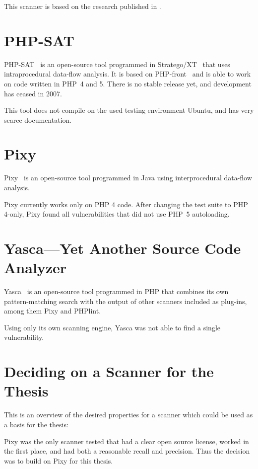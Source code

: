 This scanner is based on the research published in \cite{huang-securing}.

\section{PHP-SAT}
\label{php-sat}
PHP-SAT~\cite{php-sat} is an open-source tool programmed in Stratego/XT~\cite{stratego} that uses intraprocedural data-flow analysis. It is based on PHP-front~\cite{php-front} and is able to work on code written in PHP~4 and 5. There is no stable release yet, and development has ceased in 2007.

This tool does not compile on the used testing environment Ubuntu, and has very scarce documentation.

\section{Pixy}
\label{pixy-comparison}
Pixy~\cite{pixy} is an open-source tool programmed in Java using interprocedural data-flow analysis.

Pixy currently works only on PHP 4 code. After changing the test suite to PHP 4-only, Pixy found all vulnerabilities that did not use PHP~5 autoloading.

\section{Yasca---Yet Another Source Code Analyzer}
\label{yasca}
Yasca~\cite{yasca} is an open-source tool programmed in PHP that combines its own pattern-matching search with the output of other scanners included as plug-ins, among them Pixy and PHPlint.

Using only its own scanning engine, Yasca was not able to find a single vulnerability.


\section{Deciding on a Scanner for the Thesis}

This is an overview of the desired properties for a scanner which could be used as a basis for the thesis:


Pixy was the only scanner tested that had a clear open source license, worked in the first place, and had both a reasonable recall and precision. Thus the decision was to build on Pixy for this thesis.

